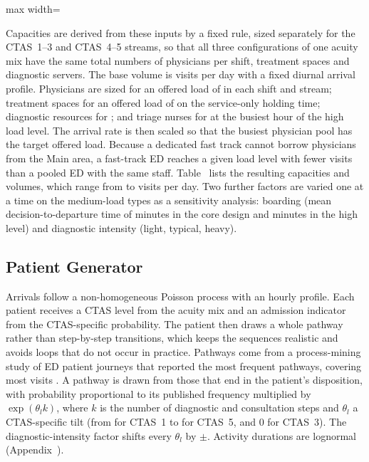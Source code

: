 \begin{table}[!htbp]
\centering
\caption{Acuity mixes, admission probabilities, CTAS targets and mean physician assessment times by CTAS level.}
\label{tab:parameters}
\footnotesize
\setlength{\tabcolsep}{3.5pt}
\begin{adjustbox}{max width=\linewidth}\end{adjustbox}
\end{table}

Capacities are derived from these inputs by a fixed rule, sized separately for the CTAS~1--3 and CTAS~4--5 streams, so that all three configurations of one acuity mix have the same total numbers of physicians per shift, treatment spaces and diagnostic servers. The base volume is \BaseVisits{} visits per day with a fixed diurnal arrival profile. Physicians are sized for an offered load of \PhysTargetMedium{} in each shift and stream; treatment spaces for an offered load of \SpaceSizing{} on the service-only holding time; diagnostic resources for \DiagTarget; and triage nurses for \TriageTarget{} at the busiest hour of the high load level. The arrival rate is then scaled so that the busiest physician pool has the target offered load. Because a dedicated fast track cannot borrow physicians from the Main area, a fast-track ED reaches a given load level with fewer visits than a pooled ED with the same staff. Table~ lists the resulting capacities and volumes, which range from \VisitsMin{} to \VisitsMax{} visits per day. Two further factors are varied one at a time on the medium-load types as a sensitivity analysis: boarding (mean decision-to-departure time of \BoardLowMean{} minutes in the core design and \BoardHighMean{} minutes in the high level) and diagnostic intensity (light, typical, heavy).

\subsection{Patient Generator}

Arrivals follow a non-homogeneous Poisson process with an hourly profile. Each patient receives a CTAS level from the acuity mix and an admission indicator from the CTAS-specific probability. The patient then draws a whole pathway rather than step-by-step transitions, which keeps the sequences realistic and avoids loops that do not occur in practice. Pathways come from a process-mining study of ED patient journeys that reported the \NPathways{} most frequent pathways, covering most visits \cite{Rismanchian2023_PatientJourney}. A pathway is drawn from those that end in the patient's disposition, with probability proportional to its published frequency multiplied by $\exp(\theta_l k)$, where $k$ is the number of diagnostic and consultation steps and $\theta_l$ a CTAS-specific tilt (from \TiltOne{} for CTAS~1 to \TiltFive{} for CTAS~5, and $0$ for CTAS~3). The diagnostic-intensity factor shifts every $\theta_l$ by $\pm$\DiagShiftHeavy. Activity durations are lognormal (Appendix~).

